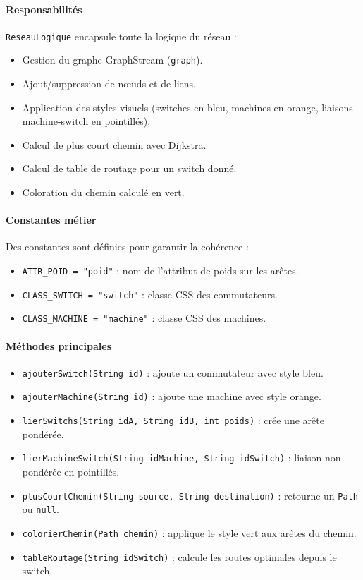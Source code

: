 \documentclass[12pt, a4paper]{article}
\begin{document}
\paragraph{Responsabilités}
\texttt{ReseauLogique} encapsule toute la logique du réseau :
\begin{itemize}
    \item Gestion du graphe GraphStream (\texttt{graph}).
    \item Ajout/suppression de nœuds et de liens.
    \item Application des styles visuels (switches en bleu, machines en orange, liaisons machine-switch en pointillés).
    \item Calcul de plus court chemin avec Dijkstra.
    \item Calcul de table de routage pour un switch donné.
    \item Coloration du chemin calculé en vert.
\end{itemize}

\paragraph{Constantes métier}
Des constantes sont définies pour garantir la cohérence :
\begin{itemize}
    \item \texttt{ATTR\_POID = "poid"} : nom de l'attribut de poids sur les arêtes.
    \item \texttt{CLASS\_SWITCH = "switch"} : classe CSS des commutateurs.
    \item \texttt{CLASS\_MACHINE = "machine"} : classe CSS des machines.
\end{itemize}

\paragraph{Méthodes principales}
\begin{itemize}
    \item \texttt{ajouterSwitch(String id)} : ajoute un commutateur avec style bleu.
    \item \texttt{ajouterMachine(String id)} : ajoute une machine avec style orange.
    \item \texttt{lierSwitchs(String idA, String idB, int poids)} : crée une arête pondérée.
    \item \texttt{lierMachineSwitch(String idMachine, String idSwitch)} : liaison non pondérée en pointillés.
    \item \texttt{plusCourtChemin(String source, String destination)} : retourne un \texttt{Path} ou \texttt{null}.
    \item \texttt{colorierChemin(Path chemin)} : applique le style vert aux arêtes du chemin.
    \item \texttt{tableRoutage(String idSwitch)} : calcule les routes optimales depuis le switch.
\end{itemize}
\end{document}
